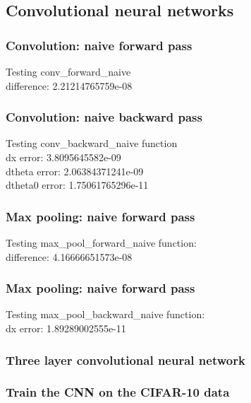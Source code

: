 \documentclass{article}
\begin{document}
\subsection{Convolutional neural networks}

\subsubsection{Convolution: naive forward pass}
{\footnotesize
Testing conv\_forward\_naive\\
difference:  2.21214765759e-08\\
}

\subsubsection{Convolution: naive backward pass}
{\footnotesize
Testing conv\_backward\_naive function\\
dx error:  3.8095645582e-09\\
dtheta error:  2.06384371241e-09\\
dtheta0 error:  1.75061765296e-11\\
}

\subsubsection{Max pooling: naive forward pass}
{\footnotesize
Testing max\_pool\_forward\_naive function:\\
difference:  4.16666651573e-08\\
}

\subsubsection{Max pooling: naive forward pass}
{\footnotesize
Testing max\_pool\_backward\_naive function:\\
dx error:  1.89289002555e-11\\
}
\subsubsection{Three layer convolutional neural network}

\subsubsection{Train the CNN on the CIFAR-10 data}
\end{document}
